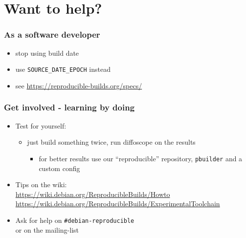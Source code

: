 \documentclass[14pt]{beamer}
\begin{document}
\section{Want to help?}

\begin{frame}
 \frametitle{As a software developer}
 \begin{itemize}
  \item stop using build date
  \item use \texttt{SOURCE\_DATE\_EPOCH} instead \\
  \item see  \url{https://reproducible-builds.org/specs/}
 \end{itemize}
\end{frame}

\begin{frame}
 \frametitle{Get involved - learning by doing}

 \begin{itemize}
  \item Test for yourself:
   \begin{itemize}
    \item just build something twice, run diffoscope on the results
    \begin{itemize}
     \item for better results use our “reproducible” repository, \texttt{pbuilder} and a custom config
    \end{itemize}
   \end{itemize}

  \item Tips on the wiki: \\
    {\small \url{https://wiki.debian.org/ReproducibleBuilds/Howto}} \\
    {\small
    \url{https://wiki.debian.org/ReproducibleBuilds/ExperimentalToolchain}}
  \item Ask for help on \texttt{\#debian-reproducible} \\
   or on the mailing-list
 \end{itemize}
\end{frame}
\end{document}
